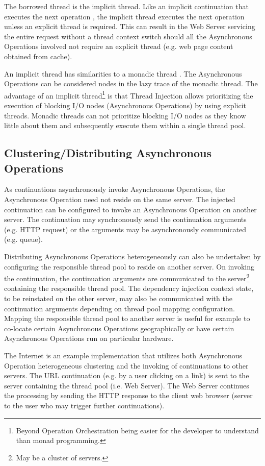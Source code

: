 \documentclass[prodmode]{style/acmlarge}
\begin{document}
The borrowed thread is the implicit thread.  Like an implicit continuation that
executes the next operation \cite{continuations}, the implicit thread executes
the next operation unless an explicit thread is required.  This can result in
the Web Server servicing the entire request without a thread context switch
should all the Asynchronous Operations involved not require an explicit thread
(e.g. web page content obtained from cache).

An implicit thread has similarities to a monadic thread \cite{monadic-thread}.
The Asynchronous Operations can be considered nodes in the lazy trace of the
monadic thread.  The advantage of an implicit thread\footnote{Beyond Operation
Orchestration being easier for the developer to understand than monad
programming.} is that Thread Injection allows prioritizing the execution of
blocking I/O nodes (Asynchronous Operations) by using explicit threads.  Monadic
threads can not prioritize blocking I/O nodes as they know little about them and
subsequently execute them within a single thread pool.


\subsection{Clustering/Distributing Asynchronous Operations}

As continuations asynchronously invoke Asynchronous Operations, the Asynchronous
Operation need not reside on the same server.  The injected continuation can be
configured to invoke an Asynchronous Operation on another server.  The
continuation may synchronously send the continuation arguments (e.g. HTTP
request) or the arguments may be asynchronously communicated (e.g.
queue).

Distributing Asynchronous Operations heterogeneously can also be undertaken by
configuring the responsible thread pool to reside on another server.  On
invoking the continuation, the continuation arguments are communicated to the
server\footnote{May be a cluster of servers.} containing the responsible thread
pool.  The dependency injection context state, to be reinstated on the other
server, may also be communicated with the continuation arguments depending on
thread pool mapping configuration.  Mapping the responsible thread pool to
another server is useful for example to co-locate certain Asynchronous
Operations geographically or have certain Asynchronous Operations run on
particular hardware.

The Internet is an example implementation that utilizes both Asynchronous
Operation heterogeneous clustering and the invoking of continuations to other
servers.  The URL continuation (e.g. by a user clicking on a link) is sent to
the server containing the thread pool (i.e. Web Server).  The Web Server
continues the processing by sending the HTTP response to the client web browser
(server to the user who may trigger further continuations).
\end{document}

